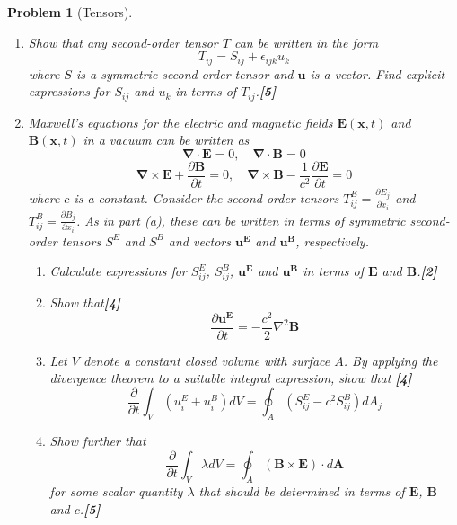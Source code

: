 \documentclass[a4paper]{article}
\theoremstyle{new}
\newtheorem{qns}{Problem}[section]
\begin{document}
\begin{qns}[Tensors]\leavevmode
\begin{enumerate}[label=(\alph*)]
\item Show that any second-order tensor $T$ can be written in the form
$$T_{ij} = S_{ij} + \epsilon_{ijk}u_k$$
where $S$ is a symmetric second-order tensor and $\mathbf{u}$ is a vector. Find explicit expressions for $S_{ij}$ and $u_k$ in terms of $T_{ij}$.\hfill\textbf{[5]}
\item Maxwell’s equations for the electric and magnetic fields $\mathbf{E}(\mathbf{x}, t)$ and $\mathbf{B}(\mathbf{x}, t)$ in a vacuum can be written as 
$$\boldsymbol{\nabla}\cdot\mathbf{E}=0,\quad\boldsymbol{\nabla}\cdot\mathbf{B}=0$$
$$\boldsymbol{\nabla}\times\mathbf{E}+\frac{\partial\mathbf{B}}{\partial t}=0,\quad\boldsymbol{\nabla}\times\mathbf{B}-\frac{1}{c^2}\frac{\partial\mathbf{E}}{\partial t}=0$$
where $c$ is a constant. Consider the second-order tensors $T^E_{ij} = \frac{\partial E_j}{\partial x_i}$ and $T^B_{ij} = \frac{\partial B_j}{\partial x_i}$. As in part (a), these can be written in terms of symmetric second-order tensors $S^E$ and $S^B$ and vectors $\mathbf{u^E}$ and $\mathbf{u^B}$, respectively.
\begin{enumerate}[label=(\roman*)]
\item  Calculate expressions for $S^E_{ij}$, $S^B_{ij}$, $\mathbf{u^E}$ and $\mathbf{u^B}$ in terms of $\mathbf{E}$ and $\mathbf{B}$.\hfill\textbf{[2]}
\item Show that\hfill\textbf{[4]}
$$\frac{\partial\mathbf{u^E}}{\partial t}=-\frac{c^2}{2}\nabla^2\mathbf{B}$$
\item Let $V$ denote a constant closed volume with surface $A$. By applying the divergence theorem to a suitable integral expression, show that \hfill\textbf{[4]}
$$\frac{\partial}{\partial t}\int_V(u_i^E+u_i^B)dV=\oint_A(S_{ij}^E-c^2S_{ij}^B)dA_j$$
\item Show further that
$$\frac{\partial}{\partial t}\int_V\lambda dV=\oint_A(\mathbf{B}\times\mathbf{E})\cdot d\mathbf{A}$$
for some scalar quantity $\lambda$ that should be determined in terms of $\mathbf{E}$, $\mathbf{B}$ and $c$.\hfill\textbf{[5]}
\end{enumerate}
\end{enumerate}
\end{qns}
\end{document}
